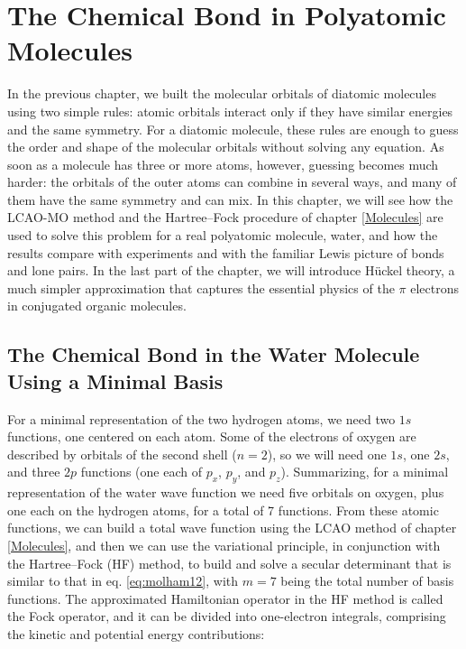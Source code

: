 \documentclass[
  english,
  9pt,
]{extbook}
\theoremstyle{definition}
\theoremstyle{definition}
\theoremstyle{definition}
\theoremstyle{definition}
\theoremstyle{remark}
\begin{document}
\chapter{The Chemical Bond in Polyatomic Molecules}\label{Poly}

In the previous chapter, we built the molecular orbitals of diatomic molecules using two simple rules: atomic orbitals interact only if they have similar energies and the same symmetry. For a diatomic molecule, these rules are enough to guess the order and shape of the molecular orbitals without solving any equation. As soon as a molecule has three or more atoms, however, guessing becomes much harder: the orbitals of the outer atoms can combine in several ways, and many of them have the same symmetry and can mix. In this chapter, we will see how the LCAO-MO method and the Hartree--Fock procedure of chapter \ref{Molecules} are used to solve this problem for a real polyatomic molecule, water, and how the results compare with experiments and with the familiar Lewis picture of bonds and lone pairs. In the last part of the chapter, we will introduce Hückel theory, a much simpler approximation that captures the essential physics of the \(\pi\) electrons in conjugated organic molecules.

\section{The Chemical Bond in the Water Molecule Using a Minimal Basis}\label{the-chemical-bond-in-the-water-molecule-using-a-minimal-basis}

For a minimal representation of the two hydrogen atoms, we need two \(1s\) functions, one centered on each atom. Some of the electrons of oxygen are described by orbitals of the second shell (\(n=2\)), so we will need one \(1s\), one \(2s\), and three \(2p\) functions (one each of \(p_x\), \(p_y\), and \(p_z\)). Summarizing, for a minimal representation of the water wave function we need five orbitals on oxygen, plus one each on the hydrogen atoms, for a total of 7 functions. From these atomic functions, we can build a total wave function using the LCAO method of chapter \ref{Molecules}, and then we can use the variational principle, in conjunction with the Hartree--Fock (HF) method, to build and solve a secular determinant that is similar to that in eq. \eqref{eq:molham12}, with \(m=7\) being the total number of basis functions. The approximated Hamiltonian operator in the HF method is called the Fock operator, and it can be divided into one-electron integrals, comprising the kinetic and potential energy contributions:
\end{document}
